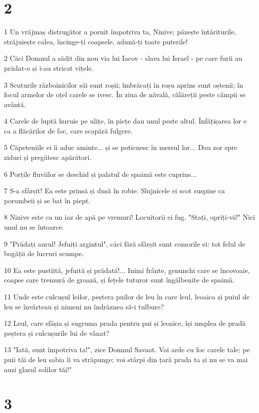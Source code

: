 \chapter{2}

\par 1 Un vrăjmaș distrugător a pornit împotriva ta, Ninive; păzește întăriturile, străjuiește calea, încinge-ți coapsele, adună-ți toate puterile!
\par 2 Căci Domnul a sădit din nou via lui Iacov - slava lui Israel - pe care furii au prădat-o și i-au stricat vițele.
\par 3 Scuturile războinicilor săi sunt roșii; îmbrăcați în roșu aprins sunt oștenii; în focul armelor de oțel carele se ivesc. În ziua de năvală, călăreții peste câmpii se avântă.
\par 4 Carele de luptă huruie pe ulițe, în piețe dau unul peste altul. Înfățișarea lor e ca a flăcărilor de foc, care scapără fulgere.
\par 5 Căpeteniile ei îi aduc aminte... și se poticnesc în mersul lor... Dau zor spre ziduri și pregătesc apărători.
\par 6 Porțile fluviilor se deschid și palatul de spaimă este cuprins...
\par 7 S-a sfârșit! Ea este prinsă și dusă în robie. Slujnicele ei scot suspine ca porumbeii și se bat în piept.
\par 8 Ninive este ca un iaz de apă pe vremuri! Locuitorii ei fug. "Stați, opriți-vă!" Nici unul nu se întoarce.
\par 9 "Prădați aurul! Jefuiți argintul", căci fără sfârșit sunt comorile ei: tot felul de bogății de lucruri scumpe.
\par 10 Ea este pustiită, jefuită și prădată!... Inimi frânte, genunchi care se încovoaie, coapse care tremură de groază, și fețele tuturor sunt îngălbenite de spaimă.
\par 11 Unde este culcușul leilor, peștera puilor de leu în care leul, leoaica și puiul de leu se învârteau și nimeni nu îndrăznea să-i tulbure?
\par 12 Leul, care sfâșia și sugruma prada pentru pui și leoaice, își umplea de pradă peștera și culcușurile lui de vânat?
\par 13 "Iată, sunt împotriva ta!", zice Domnul Savaot. Voi arde cu foc carele tale; pe puii tăi de leu sabia îi va străpunge; voi stârpi din țară prada ta și nu se va mai auzi glasul solilor tăi!"

\chapter{3}


